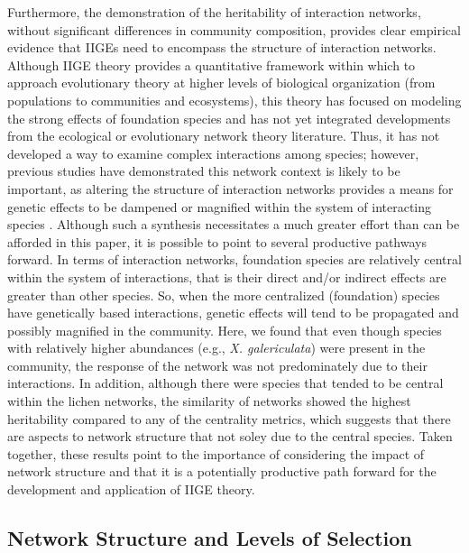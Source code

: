 \documentclass[fleqn,12pt]{olplainarticle}
\begin{document}
Furthermore, the demonstration of the heritability of interaction
networks, without significant differences in community composition,
provides clear empirical evidence that IIGEs need to encompass the
structure of interaction networks. Although IIGE theory provides a
quantitative framework within which to approach evolutionary theory at
higher levels of biological organization (from populations to
communities and ecosystems), this theory has focused on modeling the
strong effects of foundation species
\citep{Shuster2006COMMUNITYSTRUCTURE, Whitham2012,
  Whitham2020IntraspecificEvolution} and has not yet integrated
developments from the ecological or evolutionary network theory
literature. Thus, it has not developed a way to examine complex
interactions among species; however, previous studies have
demonstrated this network context is likely to be important, as
altering the structure of interaction networks provides a means for
genetic effects to be dampened or magnified within the system of
interacting species \citep{Smith2011, Keith2017}. Although such a
synthesis necessitates a much greater effort than can be afforded in
this paper, it is possible to point to several productive pathways
forward. In terms of interaction networks, foundation species are
relatively central within the system of interactions, that is their
direct and/or indirect effects are greater than other species. So,
when the more centralized (foundation) species have genetically based
interactions, genetic effects will tend to be propagated and possibly
magnified in the community. Here, we found that even though species
with relatively higher abundances (e.g., \textit{X. galericulata})
were present in the community, the response of the network was not
predominately due to their interactions. In addition, although there
were species that tended to be central within the lichen networks, the
similarity of networks showed the highest heritability compared to any
of the centrality metrics, which suggests that there are aspects to
network structure that not soley due to the central species. Taken
together, these results point to the importance of considering the
impact of network structure and that it is a potentially productive
path forward for the development and application of IIGE theory.

\subsection*{Network Structure and Levels of Selection}
\end{document}
